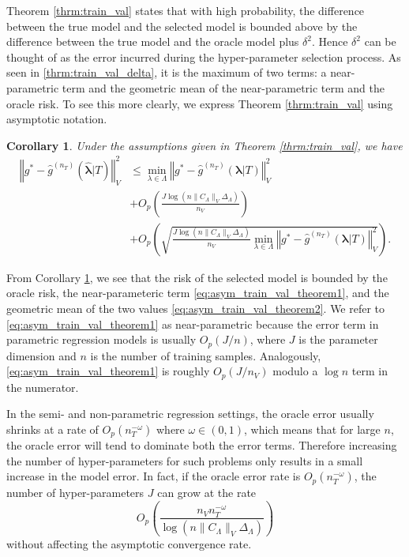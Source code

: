 \documentclass[12pt]{article} %
\newtheorem{corollary}{Corollary}
\theoremstyle{definition}
\begin{document}
Theorem \ref{thrm:train_val} states that with high probability, the difference between the true model and the selected model is bounded above by the difference between the true model and the oracle model plus $\delta^2$. Hence $\delta^2$ can be thought of as the error incurred during the hyper-parameter selection process. As seen in \eqref{thrm:train_val_delta}, it is the maximum of two terms: a near-parametric term and the geometric mean of the near-parametric term and the oracle risk. To see this more clearly, we express Theorem \ref{thrm:train_val} using asymptotic notation.
\begin{corollary}
	\label{corr:train_val}
	Under the assumptions given in Theorem \ref{thrm:train_val}, we have
	\begin{align}
	\left\Vert g^* - \hat{g}^{(n_T)}( \hat{\boldsymbol{\lambda}} | T) \right\Vert _{V}^2 &
	\le \min_{\lambda \in \Lambda} \left\Vert g^* - \hat{g}^{(n_T)}( {\boldsymbol{\lambda}} | T) \right \Vert^2_{V}\\
	& + O_p \left(\frac{J\log (n \|C_\Lambda\|_V \Delta_{\Lambda} )}{n_{V}} \right) 
	\label{eq:asym_train_val_theorem1} \\
	& + O_p \left(
	\sqrt{
		\frac{J \log (n \|C_\Lambda\|_V \Delta_{\Lambda} )}{n_{V}}
		\min_{\lambda \in \Lambda} \left\Vert g^* - \hat{g}^{(n_T)}( {\boldsymbol{\lambda}} | T) \right \Vert^2_{V}
	}
	\right ).
	\label{eq:asym_train_val_theorem2}
	\end{align}
\end{corollary}
From Corollary \ref{corr:train_val}, we see that the risk of the selected model is bounded by the oracle risk, the near-parameteric term \eqref{eq:asym_train_val_theorem1}, and the geometric mean of the two values \eqref{eq:asym_train_val_theorem2}.
We refer to \eqref{eq:asym_train_val_theorem1} as near-parametric because the error term in parametric regression models is usually $O_p(J/n)$, where $J$ is the parameter dimension and $n$ is the number of training samples. Analogously, \eqref{eq:asym_train_val_theorem1} is roughly $O_p(J/n_V)$ modulo a $\log n$ term in the numerator.

In the semi- and non-parametric regression settings, the oracle error usually shrinks at a rate of $O_p(n_T^{-\omega})$ where $\omega \in (0, 1)$, which means that for large $n$, the oracle error will tend to dominate both the error terms. Therefore increasing the number of hyper-parameters for such problems only results in a small increase in the model error. In fact, if the oracle error rate is $O_p(n_T^{-\omega})$, the number of hyper-parameters $J$ can grow at the rate
\begin{equation}
O_p\left (
\frac{n_{V} n_T^{-\omega}}{\log (n \|C_\Lambda\|_V \Delta_{\Lambda})}
\right )
\end{equation}
without affecting the asymptotic convergence rate.
\end{document}
